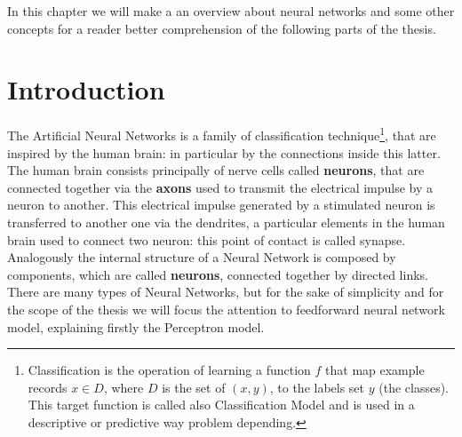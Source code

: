\label{sl-nn}
In this chapter we will make a an overview about neural networks and some other concepts for a reader better comprehension of the following parts of the thesis.

\section{Introduction}
The Artificial Neural Networks is a family of classification technique\footnote{Classification is the operation of learning a function \textbf{$f$} that map example records \textbf{$x \in D$}, where $D$ is the set of \textbf{$(x, y)$}, to the labels set \textbf{$y$} (the classes). This target function is called also Classification Model and is used in a descriptive or predictive way problem depending.}, that are inspired by the human brain: in particular by the connections inside this latter. The human brain consists principally of nerve cells called \textbf{neurons}, that are connected together via the \textbf{axons} used to transmit the electrical impulse by a neuron to another. This electrical impulse generated by a stimulated neuron is transferred to another one via the dendrites, a particular elements in the human brain used to connect two neuron: this point of contact is called synapse. \newline Analogously the internal structure of a Neural Network is composed by components, which are called \textbf{neurons}, connected together by directed links. There are many types of Neural Networks, but for the sake of simplicity and  for the scope of the thesis we will focus the attention to feedforward neural network model, explaining firstly the Perceptron model.

